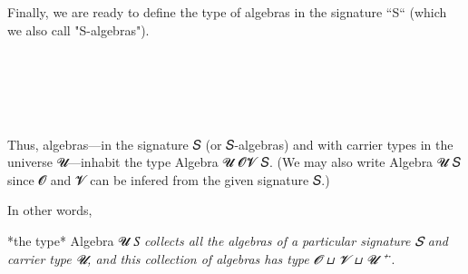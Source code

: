 \documentclass[sigplan,screen]{acmart}
\begin{document}
Finally, we are ready to define the type of algebras in the signature ``S`` (which we also call "S-algebras").

\begin{code}%
\>[0]\AgdaSpace{}%
\AgdaSymbol{:}%
\>[98I]\AgdaSymbol{(}\AgdaSpace{}%
\AgdaSymbol{:}\AgdaSpace{}%
\AgdaSymbol{)\{}\AgdaSpace{}%
\AgdaSpace{}%
\AgdaSymbol{:}\AgdaSpace{}%
\AgdaSymbol{\}}\<%
\\
\>[.][@{}l@{}]\<[98I]%
\>[10]\AgdaSymbol{(}\AgdaSpace{}%
\AgdaSymbol{:}\AgdaSpace{}%
\AgdaSpace{}%
\AgdaSpace{}%
\AgdaSymbol{)}\AgdaSpace{}%
%
\>[33]\AgdaSpace{}%
\AgdaSpace{}%
\AgdaSpace{}%
\AgdaSpace{}%
\AgdaSpace{}%
\AgdaSpace{}%
\<%
\\
%
\\[\AgdaEmptyExtraSkip]%
\>[0]\AgdaSpace{}%
\AgdaSpace{}%
\AgdaSymbol{\{}\AgdaSymbol{\}\{}\AgdaSymbol{\}}\AgdaSpace{}%
\AgdaSpace{}%
\AgdaSymbol{=}\AgdaSpace{}\<%
\\
\>[.][@{}l@{}]\<[98I]%
\>[10]
\AgdaSpace{}%
\AgdaSpace{}%
\AgdaSpace{}%
\AgdaSpace{}%
\AgdaSpace{}%
\AgdaFunction{,}\AgdaSpace{}%
\AgdaSymbol{((}\AgdaSpace{}%
\AgdaSymbol{:}\AgdaSpace{}%
\AgdaSpace{}%
\AgdaSpace{}%
\AgdaSymbol{)}\AgdaSpace{}%
\AgdaSpace{}%
\AgdaSpace{}%
\AgdaSymbol{(}\AgdaSpace{}%
\AgdaSpace{}%
\AgdaSpace{}%
\AgdaSymbol{)}\AgdaSpace{}%
\AgdaSymbol{)}\<%
\end{code}

Thus, algebras---in the signature 𝑆 (or 𝑆-algebras) and with carrier types in the universe 𝓤---inhabit the type Algebra 𝓤 {𝓞}{𝓥} 𝑆.  (We may also write Algebra 𝓤 𝑆 since 𝓞 and 𝓥 can be infered from the given signature 𝑆.)

In other words,

  *the type* Algebra 𝓤 𝑆 \emph{collects all the algebras of a particular signature 𝑆 and carrier type 𝓤, and this collection of algebras has type 𝓞 ⊔ 𝓥 ⊔  𝓤 ⁺ ̇}.
\end{document}
